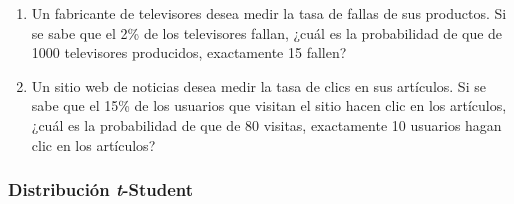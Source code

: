 \begin{Ejer}
\begin{enumerate}
    \item Un fabricante de televisores desea medir la tasa de fallas de sus productos. Si se sabe que el 2\% de los televisores fallan, ¿cuál es la probabilidad de que de 1000 televisores producidos, exactamente 15 fallen?

    \item Un sitio web de noticias desea medir la tasa de clics en sus artículos. Si se sabe que el 15\% de los usuarios que visitan el sitio hacen clic en los artículos, ¿cuál es la probabilidad de que de 80 visitas, exactamente 10 usuarios hagan clic en los artículos?
\end{enumerate}
\end{Ejer}


\subsubsection{Distribución \textit{t}-Student}
